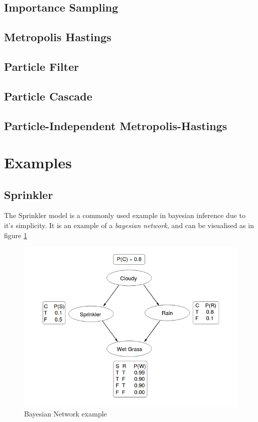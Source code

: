 \subsection{Importance Sampling} \label{sec:imp}
\subsection{Metropolis Hastings} \label{sec:mh}
\subsection{Particle Filter} \label{sec:pf}
\subsection{Particle Cascade} \label{sec:pc}
\subsection{Particle-Independent Metropolis-Hastings} \label{sec:pimh}

\section{Examples}

\subsection{Sprinkler}
The Sprinkler model is a commonly used example in bayesian inference due to it's simplicity. It is an example of a \textit{bayesian network}, and can be visualised as in figure \ref{fig:sprinkler-network}

\begin{figure}[!htb]
    \centering
    \includegraphics[width=\textwidth]{figs/sprinkler-network.png}
    \caption{Bayesian Network example}
    \label{fig:sprinkler-network}
\end{figure}

